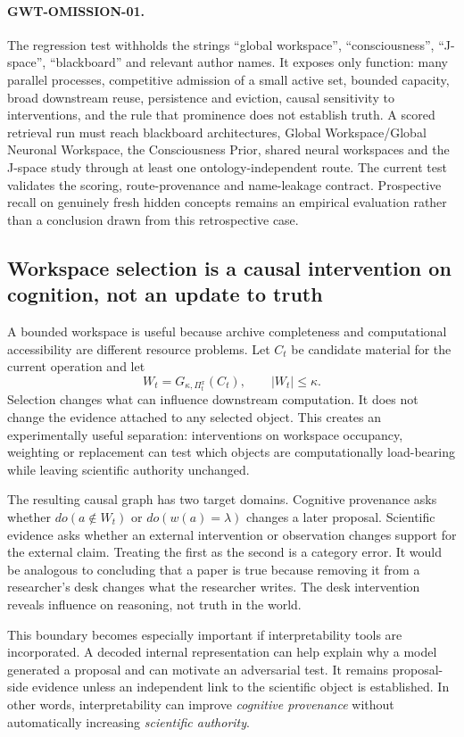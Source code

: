 \paragraph{GWT-OMISSION-01.}
The regression test withholds the strings ``global workspace'', ``consciousness'', ``J-space'', ``blackboard'' and relevant author names. It exposes only function: many parallel processes, competitive admission of a small active set, bounded capacity, broad downstream reuse, persistence and eviction, causal sensitivity to interventions, and the rule that prominence does not establish truth. A scored retrieval run must reach blackboard architectures, Global Workspace/Global Neuronal Workspace, the Consciousness Prior, shared neural workspaces and the J-space study through at least one ontology-independent route. The current test validates the scoring, route-provenance and name-leakage contract. Prospective recall on genuinely fresh hidden concepts remains an empirical evaluation rather than a conclusion drawn from this retrospective case.

\subsection{Workspace selection is a causal intervention on cognition, not an update to truth}

A bounded workspace is useful because archive completeness and computational accessibility are different resource problems. Let \(C_t\) be candidate material for the current operation and let
\[
W_t=G_{\kappa,\Pi_t^x}(C_t),\qquad |W_t|\le\kappa .
\]
Selection changes what can influence downstream computation. It does not change the evidence attached to any selected object. This creates an experimentally useful separation: interventions on workspace occupancy, weighting or replacement can test which objects are computationally load-bearing while leaving scientific authority unchanged.

The resulting causal graph has two target domains. Cognitive provenance asks whether \(do(a\notin W_t)\) or \(do(w(a)=\lambda)\) changes a later proposal. Scientific evidence asks whether an external intervention or observation changes support for the external claim. Treating the first as the second is a category error. It would be analogous to concluding that a paper is true because removing it from a researcher's desk changes what the researcher writes. The desk intervention reveals influence on reasoning, not truth in the world.

This boundary becomes especially important if interpretability tools are incorporated. A decoded internal representation can help explain why a model generated a proposal and can motivate an adversarial test. It remains proposal-side evidence unless an independent link to the scientific object is established. In other words, interpretability can improve \emph{cognitive provenance} without automatically increasing \emph{scientific authority}.

